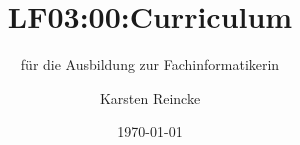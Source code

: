 \documentclass[]{beamer}
\title{LF03:00:Curriculum}
\subtitle{für die Ausbildung zur Fachinformatikerin}
\institute[GS-LDK]{Gewerbliche Schulen Dillenburg}
\author{Karsten Reincke}
\date{\today}
\def\cfgGl{../../../cfg.gl/}
\begin{document}

\begin{frame}
  \titlepage

  
\end{frame}






\logo{}
\newpage



%
\end{document}
